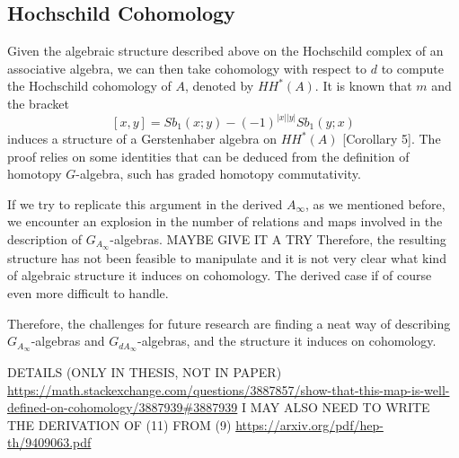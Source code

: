 \documentclass[join.tex]{subfiles}
\begin{document}
\subsection{Hochschild Cohomology}

Given the algebraic structure described above on the Hochschild complex of an associative algebra, we can then take cohomology with respect to $d$ to compute the Hochschild cohomology of $A$, denoted by $HH^*(A)$. It is known that $m$ and the bracket 
\[[x,y]=Sb_1(x; y) -(-1)^{|x||y|}Sb_1(y; x)\]
induces a structure of a Gerstenhaber algebra on $HH^*(A)$ \cite{GV}[Corollary 5]. The proof relies on some identities that can be deduced from the definition of homotopy $G$-algebra, such has graded homotopy commutativity. 

If we try to replicate this argument in the derived $A_\infty$, as we mentioned before, we encounter an explosion in the number of relations and maps involved in the description of $G_{A_\infty}$-algebras. MAYBE GIVE IT A TRY Therefore, the resulting structure has not been feasible to manipulate and it is not very clear what kind of algebraic structure it induces on cohomology. The derived case if of course even more difficult to handle.

Therefore, the challenges for future research are finding a neat way of describing $G_{A_\infty}$-algebras and $G_{dA_\infty}$-algebras, and the structure it induces on cohomology.


DETAILS (ONLY IN THESIS, NOT IN PAPER)
\url{https://math.stackexchange.com/questions/3887857/show-that-this-map-is-well-defined-on-cohomology/3887939#3887939}%
I MAY ALSO NEED TO WRITE THE DERIVATION OF (11) FROM (9)
\url{https://arxiv.org/pdf/hep-th/9409063.pdf}


%
%
%
%
%
\end{document}
